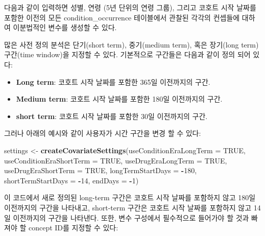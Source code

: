 \documentclass[11pt]{book}
\newenvironment{Shaded}{\begin{snugshade}}{\end{snugshade}}
\newcommand{\KeywordTok}[1]{\textcolor[rgb]{0.13,0.29,0.53}{\textbf{#1}}}
\newcommand{\DataTypeTok}[1]{\textcolor[rgb]{0.13,0.29,0.53}{#1}}
\newcommand{\DecValTok}[1]{\textcolor[rgb]{0.00,0.00,0.81}{#1}}
\newcommand{\StringTok}[1]{\textcolor[rgb]{0.31,0.60,0.02}{#1}}
\newcommand{\OtherTok}[1]{\textcolor[rgb]{0.56,0.35,0.01}{#1}}
\newcommand{\OperatorTok}[1]{\textcolor[rgb]{0.81,0.36,0.00}{\textbf{#1}}}
\newcommand{\NormalTok}[1]{#1}
\providecommand{\tightlist}{%
  \setlength{\itemsep}{0pt}\setlength{\parskip}{0pt}}
\theoremstyle{definition}
\theoremstyle{definition}
\theoremstyle{definition}
\theoremstyle{remark}
\begin{document}
다음과 같이 입력하면 성별, 연령 (5년 단위의 연령 그룹), 그리고 코호트
시작 날짜를 포함한 이전의 모든 condition\_occurrence 테이블에서 관찰된
각각의 컨셉들에 대하여 이분법적인 변수를 생성할 수 있다.

많은 사전 정의 분석은 단기(short term), 중기(medium term), 혹은
장기(long term) 구간(time window)을 지정할 수 있다. 기본적으로 구간들은
다음과 같이 정의 되어 있다:

\begin{itemize}
\tightlist
\item
  \textbf{Long term}: 코호트 시작 날짜를 포함한 365일 이전까지의 구간.
\item
  \textbf{Medium term}: 코호트 시작 날짜를 포함한 180일 이전까지의 구간.
\item
  \textbf{short term}: 코호트 시작 날짜를 포함한 30일 이전까지의 구간.
\end{itemize}

그러나 아래의 예시와 같이 사용자가 시간 구간을 변경 할 수 있다:

\begin{Shaded}
\begin{Highlighting}[]
\NormalTok{settings <-}\StringTok{ }\KeywordTok{createCovariateSettings}\NormalTok{(}\DataTypeTok{useConditionEraLongTerm =} \OtherTok{TRUE}\NormalTok{, }
                                    \DataTypeTok{useConditionEraShortTerm =} \OtherTok{TRUE}\NormalTok{, }
                                    \DataTypeTok{useDrugEraLongTerm =} \OtherTok{TRUE}\NormalTok{,}
                                    \DataTypeTok{useDrugEraShortTerm =} \OtherTok{TRUE}\NormalTok{, }
                                    \DataTypeTok{longTermStartDays =} \OperatorTok{-}\DecValTok{180}\NormalTok{, }
                                    \DataTypeTok{shortTermStartDays =} \OperatorTok{-}\DecValTok{14}\NormalTok{, }
                                    \DataTypeTok{endDays =} \OperatorTok{-}\DecValTok{1}\NormalTok{) }
\end{Highlighting}
\end{Shaded}

이 코드에서 새로 정의된 long-term 구간은 코호트 시작 날짜를 포함하지
않고 180일 이전까지의 구간을 나타내고, short-term 구간은 코호트 시작
날짜를 포함하지 않고 14일 이전까지의 구간을 나타낸다. 또한, 변수
구성에서 필수적으로 들어가야 할 것과 빠져야 할 concept ID를 지정할 수
있다:
\end{document}
